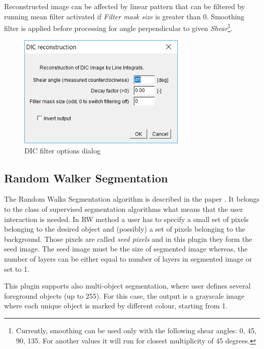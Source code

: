 \documentclass[a4paper,12pt]{article}
\begin{document}
Reconstructed image can be affected by linear pattern that can be filtered by running mean filter activated if \textit{Filter mask size} is greater than 0. Smoothing filter is applied before processing for angle perpendicular to given \textit{Shear}\footnote{Currently, smoothing can be used only with the following shear angles: 0, 45, 90, 135. For another values it will run for closest multiplicity of 45 degrees.}.
   
\begin{figure}[ht]
	\centering
	\includegraphics[width=8cm]{DICwindow.png} 
	\caption{DIC filter options dialog}
	\label{fig:dicdialog}
\end{figure} 

\noindent{}

\subsection{Random Walker Segmentation}
\label{sec:RWSeg}
The Random Walks Segmentation algorithm is described in the paper \cite{Grady2006}. It belongs to the class of supervised segmentation algorithms what means that the user interaction is needed. In RW method a user has to specify a small set of pixels belonging to the desired object and (possibly) a set of pixels belonging to the background. Those pixels are called \textit{seed pixels} and in this plugin they form the seed image. The seed image must be the size of segmented image whereas, the number of layers can be either equal to number of layers in segmented image or set to 1. 

This plugin supports also multi-object segmentation, where user defines several foreground objects (up to 255). For this case, the output is a grayscale image where each unique object is marked by different colour, starting from 1. 
\end{document}
